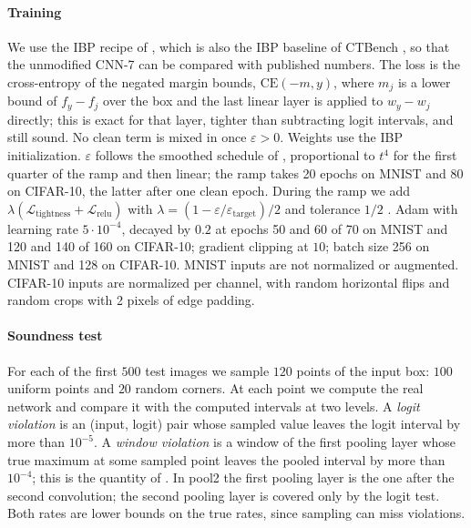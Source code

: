 \documentclass[preprint,12pt]{elsarticle}
\theoremstyle{definition}
\newcommand{\eps}{\varepsilon}
\begin{document}
\paragraph{Training} We use the IBP recipe of \citet{shi2021}, which is also the IBP baseline of CTBench \cite{mao2024ctbench}, so that the unmodified CNN-7 can be compared with published numbers. The loss is the cross-entropy of the negated margin bounds, $\mathrm{CE}(-m,y)$, where $m_j$ is a lower bound of $f_y-f_j$ over the box and the last linear layer is applied to $w_y-w_j$ directly; this is exact for that layer, tighter than subtracting logit intervals, and still sound. No clean term is mixed in once $\eps>0$. Weights use the IBP initialization. $\eps$ follows the smoothed schedule of \citet{gowal2018}, proportional to $t^4$ for the first quarter of the ramp and then linear; the ramp takes 20 epochs on MNIST and 80 on CIFAR-10, the latter after one clean epoch. During the ramp we add $\lambda(\mathcal L_{\mathrm{tightness}}+\mathcal L_{\mathrm{relu}})$ with $\lambda=(1-\eps/\eps_{\mathrm{target}})/2$ and tolerance $1/2$ \cite{shi2021}. Adam with learning rate $5\cdot10^{-4}$, decayed by $0.2$ at epochs 50 and 60 of 70 on MNIST and 120 and 140 of 160 on CIFAR-10; gradient clipping at $10$; batch size 256 on MNIST and 128 on CIFAR-10. MNIST inputs are not normalized or augmented. CIFAR-10 inputs are normalized per channel, with random horizontal flips and random crops with 2 pixels of edge padding.

\paragraph{Soundness test} For each of the first $500$ test images we sample $120$ points of the input box: $100$ uniform points and $20$ random corners. At each point we compute the real network and compare it with the computed intervals at two levels. A \emph{logit violation} is an (input, logit) pair whose sampled value leaves the logit interval by more than $10^{-5}$. A \emph{window violation} is a window of the first pooling layer whose true maximum at some sampled point leaves the pooled interval by more than $10^{-4}$; this is the quantity of . In pool2 the first pooling layer is the one after the second convolution; the second pooling layer is covered only by the logit test. Both rates are lower bounds on the true rates, since sampling can miss violations.
\end{document}
